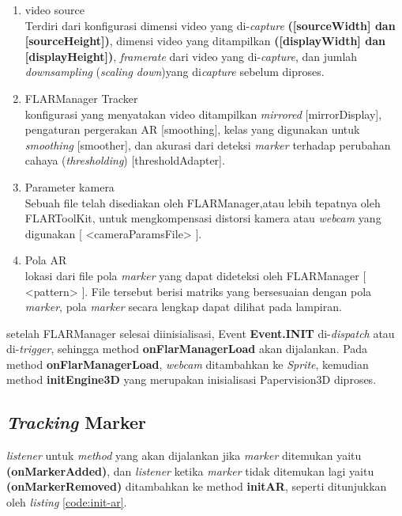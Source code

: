 \begin{enumerate}
	\item video source\\
	Terdiri dari konfigurasi dimensi video yang di-\textit{capture} \textbf{([sourceWidth] dan [sourceHeight])}, dimensi video yang ditampilkan  \textbf{([displayWidth] dan [displayHeight])}, \textit{framerate} dari video yang di-\textit{capture}, dan jumlah \textit{downsampling} (\textit{scaling down})yang di\textit{capture} sebelum diproses. 
	
	\item FLARManager Tracker\\
	konfigurasi yang menyatakan video ditampilkan \textit{mirrored} [mirrorDisplay], pengaturan pergerakan AR [smoothing], kelas yang digunakan untuk \textit{smoothing} [smoother], dan akurasi dari deteksi \textit{marker} terhadap perubahan cahaya (\textit{thresholding}) [thresholdAdapter].
	
	\item Parameter kamera\\
	Sebuah file telah disediakan oleh FLARManager,atau lebih tepatnya oleh FLARToolKit, untuk mengkompensasi distorsi kamera atau \textit{webcam} yang digunakan  [ <cameraParamsFile> ].
	
	\item Pola AR\\
	lokasi dari file pola \textit{marker} yang dapat dideteksi oleh FLARManager [ <pattern> ]. File tersebut berisi matriks yang bersesuaian dengan pola \textit{marker}, pola \textit{marker} secara lengkap dapat dilihat pada lampiran.
\end{enumerate}

setelah FLARManager selesai diinisialisasi, Event \textbf{Event.INIT} di-\textit{dispatch} atau di-\textit{trigger}, sehingga method \textbf{onFlarManagerLoad} akan dijalankan. Pada method \textbf{onFlarManagerLoad}, \textit{webcam} ditambahkan ke \textit{Sprite}, kemudian method \textbf{initEngine3D} yang merupakan inisialisasi Papervision3D diproses.

\subsection{\textit{Tracking} Marker}
\label{subsec:implementasi_tracking_marker}
\textit{listener} untuk \textit{method} yang akan dijalankan jika \textit{marker} ditemukan yaitu \textbf{(onMarkerAdded)}, dan \textit{listener} ketika \textit{marker} tidak ditemukan lagi yaitu \textbf{(onMarkerRemoved)} ditambahkan ke method \textbf{initAR}, seperti ditunjukkan oleh \textit{listing} \ref{code:init-ar}.

